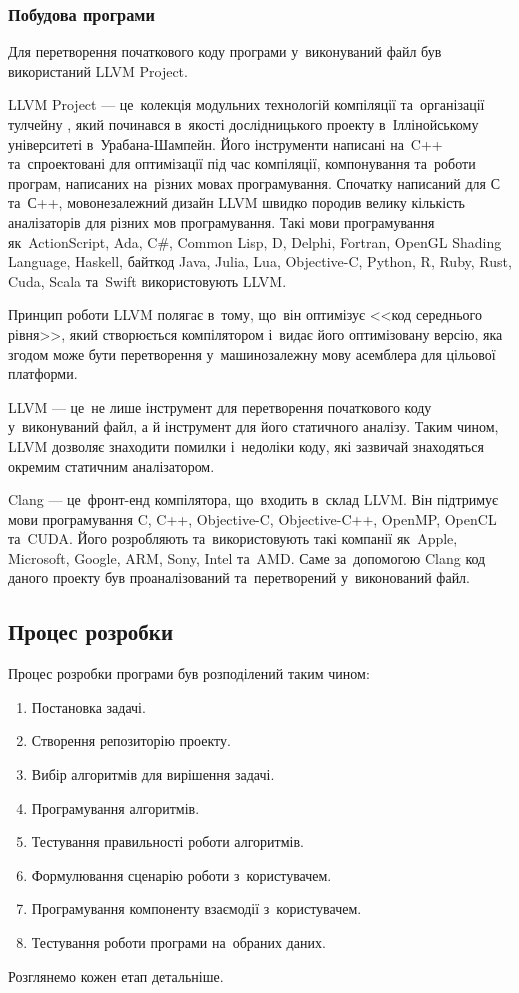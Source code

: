 \documentclass[a4paper,oneside,titlepage,14pt]{extarticle}
\begin{document}
				\subsubsection{Побудова програми}
					Для перетворення початкового коду програми у~виконуваний файл був використаний LLVM Project.\par
					LLVM Project --- це~колекція модульних технологій компіляції та~організації тулчейну \cite{llvm}, який починався в~якості дослідницького проекту в~Іллінойському університеті в~Урабана-Шампейн. Його інструменти написані на~C++ та~спроектовані для оптимізації під час компіляції, компонування та~роботи програм, написаних на~різних мовах програмування. Спочатку написаний для С та~С++, мовонезалежний дизайн LLVM швидко породив велику кількість аналізаторів для різних мов програмування. Такі мови програмування як~Action\-Script, Ada, C\#, Com\-mon Lisp, D, Delphi, For\-tran, OpenGL Sha\-ding Lan\-gua\-ge, Has\-kell, байткод Java, Julia, Lua, Objective-C, Python, R, Ruby, Rust, Cuda, Scala та~Swift використовують LLVM.\par
					Принцип роботи LLVM полягає в~тому, що~він оптимізує <<код середнього рівня>>, який створюється компілятором і~видає його оптимізовану версію, яка згодом може бути перетворення у~машинозалежну мову асемблера для цільової платформи.\par
					LLVM --- це~не лише інструмент для перетворення початкового коду у~виконуваний файл, а й інструмент для його статичного аналізу. Таким чином, LLVM дозволяє знаходити помилки і~недоліки коду, які зазвичай знаходяться окремим статичним аналізатором.\par
					Clang --- це~фронт-енд компілятора, що~входить в~склад LLVM. Він підтримує мови програмування C, C++, Objective-C, Objective-C++, Open\-MP, Open\-CL та~CUDA. Його розробляють та~використовують такі компанії як~Apple, Microsoft, Google, ARM, Sony, Intel та~AMD. Саме за~допомогою Clang код даного проекту був проаналізований та~перетворений у~виконований файл.\par
		\subsection{Процес розробки}
			Процес розробки програми був розподілений таким чином:
			\begin{enumerate}
				\item Постановка задачі.
				\item Створення репозиторію проекту.
				\item Вибір алгоритмів для вирішення задачі.
				\item Програмування алгоритмів.
				\item Тестування правильності роботи алгоритмів.
				\item Формулювання сценарію роботи з~користувачем.
				\item Програмування компоненту взаємодії з~користувачем.
				\item Тестування роботи програми на~обраних даних.
			\end{enumerate}
			\par
			Розглянемо кожен етап детальніше.\par
\end{document}
